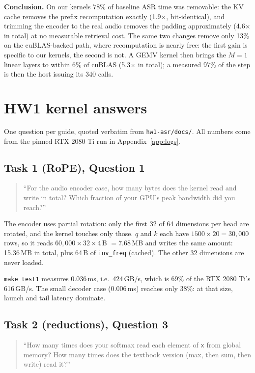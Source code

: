 \documentclass{article}
\begin{document}
\textbf{Conclusion.} On our kernels 78\% of baseline ASR time was removable: the KV
cache removes the prefix recomputation exactly (1.9$\times$, bit-identical), and
trimming the encoder to the real audio removes the padding approximately (4.6$\times$
in total) at no measurable retrieval cost. The same two changes remove only 13\% on the
cuBLAS-backed path, where recomputation is nearly free: the first gain is specific to
our kernels, the second is not. A GEMV kernel then brings the $M=1$ linear layers to within 6\% of cuBLAS (5.3$\times$ in
total); a measured 97\% of the step is then the host issuing its 340 calls.




\appendix

\section{HW1 kernel answers}
\label{app:hw1}

One question per guide, quoted verbatim from \texttt{hw1-asr/docs/}. All numbers come
from the pinned RTX 2080 Ti run in Appendix~\ref{app:logs}.

\subsection{Task 1 (RoPE), Question 1}
\begin{quote}
``For the audio encoder case, how many bytes does the kernel read and write in total?
Which fraction of your GPU's peak bandwidth did you reach?''
\end{quote}

The encoder uses partial rotation: only the first 32 of 64 dimensions per head
are rotated, and the kernel touches only those. $q$ and $k$ each have
$1500 \times 20 = 30{,}000$ rows, so it reads $60{,}000 \times 32 \times 4$\,B
$= 7.68$\,MB and writes the same amount: 15.36\,MB in total, plus 64\,B of
\texttt{inv\_freq} (cached). The other 32 dimensions are never loaded.

\texttt{make test1} measures 0.036\,ms, i.e.\ 424\,GB/s, which is 69\% of the
RTX 2080 Ti's 616\,GB/s. The small decoder case (0.006\,ms) reaches only 38\%:
at that size, launch and tail latency dominate.

\subsection{Task 2 (reductions), Question 3}
\begin{quote}
``How many times does your softmax read each element of \texttt{x} from global memory?
How many times does the textbook version (max, then sum, then write) read it?''
\end{quote}
\end{document}
